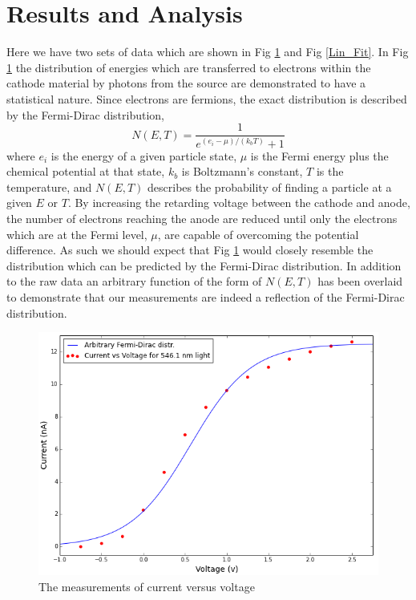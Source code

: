 \documentclass[prb,preprint]{revtex4-1}
\begin{document}
\section{Results and Analysis}

Here we have two sets of data which are shown in Fig \ref{CvsV} and Fig \ref{Lin_Fit}. In Fig \ref{CvsV} the distribution of energies which are transferred to electrons within the cathode material by photons from the source are demonstrated to have a statistical nature. Since electrons are fermions, the exact distribution is described by the Fermi-Dirac distribution,
\begin{equation}
N(E,T)=\frac{1}{e^{(e_i-\mu)/(k_bT)}+1}
\end{equation}
where $e_i$ is the energy of a given particle state, $\mu$ is the Fermi energy plus the chemical potential at that state, $k_b$ is Boltzmann's constant, $T$ is the temperature, and $N(E,T)$ describes the probability of finding a particle at a given $E$ or $T$. By increasing the retarding voltage between the cathode and anode, the number of electrons reaching the anode are reduced until only the electrons which are at the Fermi level, $\mu$, are capable of overcoming the potential difference. As such we should expect that Fig \ref{CvsV} would closely resemble the distribution which can be predicted by the Fermi-Dirac distribution. In addition to the raw data an arbitrary function of the form of $N(E,T)$ has been overlaid to demonstrate that our measurements are indeed a reflection of the Fermi-Dirac distribution.

 
\begin{figure}[h!]
\centering
\includegraphics[width=.75\textwidth]{CvsV_overlay.png}
\caption{The measurements of current versus voltage}
\label{CvsV}
\end{figure}

\newpage
\end{document}
